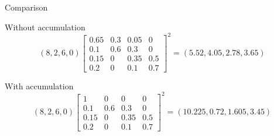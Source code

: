 \begin{frame}{Comparison}
	
		Without accumulation
		$$
		(8,2,6,0)
		{\begin{bmatrix}
		0.65 & 0.3 & 0.05 & 0\\
		0.1  & 0.6 & 0.3  & 0\\
		0.15 & 0   & 0.35 & 0.5\\
		0.2  & 0   & 0.1  & 0.7
		\end{bmatrix}}^2
		=
		(5.52,4.05,2.78,3.65)
		$$
		
		With accumulation
$$
(8,2,6,0)
{\begin{bmatrix}
1 & 0 & 0 & 0\\
0.1  & 0.6 & 0.3  & 0\\
0.15 & 0   & 0.35 & 0.5\\
0.2  & 0   & 0.1  & 0.7
\end{bmatrix}}^2
=
(10.225,0.72,1.605,3.45)
$$
	
\end{frame}